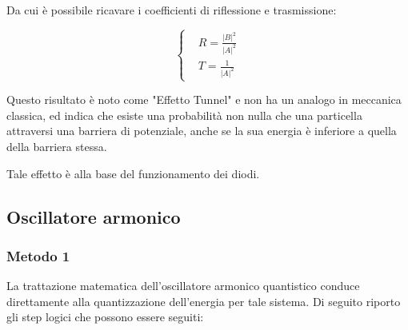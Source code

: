 \documentclass{report}
\begin{document}
Da cui è possibile ricavare i coefficienti di riflessione e trasmissione:

\begin{equation}
  \left\{
  \begin{aligned}
     & R= \frac{|B|^2}{|A|^2} \\
     & T= \frac{1}{|A|^2}
  \end{aligned}
  \right.
\end{equation}

Questo risultato è noto come "Effetto Tunnel" e non ha un analogo in meccanica classica, ed indica che esiste una probabilità non nulla
che una particella attraversi una barriera di potenziale, anche se la sua energia è inferiore a quella della barriera stessa.

Tale effetto è alla base del funzionamento dei diodi.



\subsection{Oscillatore armonico}
\subsubsection{Metodo 1}
La trattazione matematica dell'oscillatore armonico quantistico conduce direttamente alla quantizzazione dell'energia per tale sistema.
Di seguito riporto gli step logici che possono essere seguiti:
\end{document}
